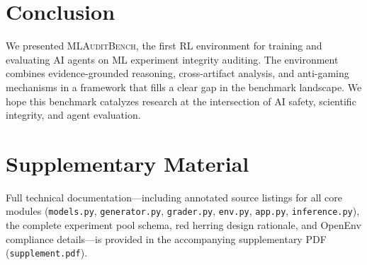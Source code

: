 \documentclass{article}
\begin{document}
\section{Conclusion}

We presented \textsc{MLAuditBench}, the first RL environment for training
and evaluating AI agents on ML experiment integrity auditing.  The
environment combines evidence-grounded reasoning, cross-artifact analysis,
and anti-gaming mechanisms in a framework that fills a clear gap in the
benchmark landscape.  We hope this benchmark catalyzes research at the
intersection of AI safety, scientific integrity, and agent evaluation.





\clearpage
\appendix
\section*{Supplementary Material}
Full technical documentation—including annotated source listings for all
core modules (\texttt{models.py}, \texttt{generator.py}, \texttt{grader.py},
\texttt{env.py}, \texttt{app.py}, \texttt{inference.py}), the complete
experiment pool schema, red herring design rationale, and OpenEnv compliance
details—is provided in the accompanying supplementary PDF (\texttt{supplement.pdf}).
\end{document}

